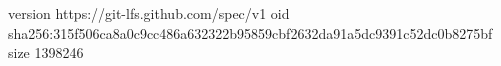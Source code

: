 version https://git-lfs.github.com/spec/v1
oid sha256:315f506ca8a0c9cc486a632322b95859cbf2632da91a5dc9391c52dc0b8275bf
size 1398246
